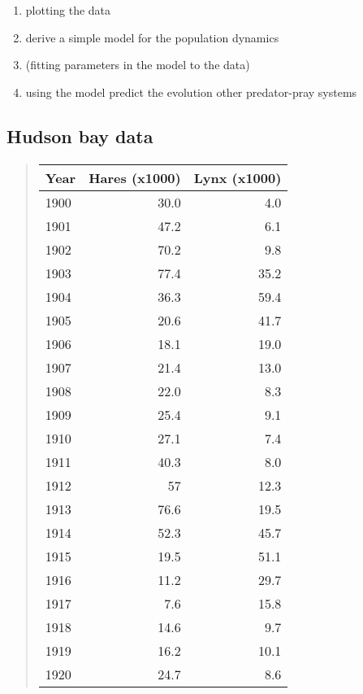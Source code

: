 \documentclass[%
twoside,                 %
final,                   %
10pt]{article}
\begin{document}
\begin{enumerate}
\item plotting the data

\item derive a simple model for the population dynamics

\item (fitting parameters in the model to the data)

\item using the model predict the evolution other predator-pray systems
\end{enumerate}

\noindent



\subsection*{Hudson bay data}



\paragraph{}


\begin{quote}
\begin{tabular}{lrr}
\hline
\multicolumn{1}{c}{ Year } & \multicolumn{1}{c}{ Hares (x1000) } & \multicolumn{1}{c}{ Lynx (x1000) } \\
\hline
1900 & 30.0          & 4.0          \\
1901 & 47.2          & 6.1          \\
1902 & 70.2          & 9.8          \\
1903 & 77.4          & 35.2         \\
1904 & 36.3          & 59.4         \\
1905 & 20.6          & 41.7         \\
1906 & 18.1          & 19.0         \\
1907 & 21.4          & 13.0         \\
1908 & 22.0          & 8.3          \\
1909 & 25.4          & 9.1          \\
1910 & 27.1          & 7.4          \\
1911 & 40.3          & 8.0          \\
1912 & 57            & 12.3         \\
1913 & 76.6          & 19.5         \\
1914 & 52.3          & 45.7         \\
1915 & 19.5          & 51.1         \\
1916 & 11.2          & 29.7         \\
1917 & 7.6           & 15.8         \\
1918 & 14.6          & 9.7          \\
1919 & 16.2          & 10.1         \\
1920 & 24.7          & 8.6          \\
\hline
\end{tabular}
\end{quote}
\end{document}
